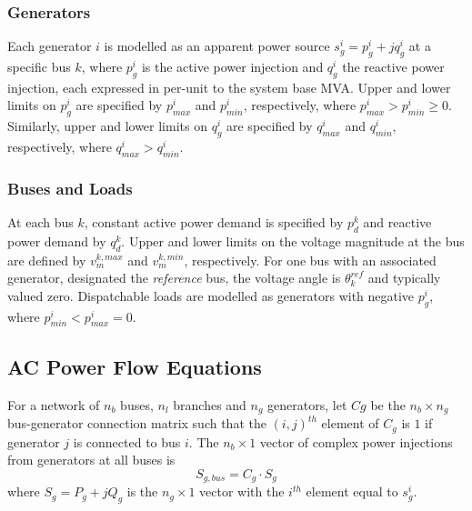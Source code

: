 \subsubsection{Generators}
Each generator $i$ is modelled as an apparent power source $s^i_g = p^i_g +
jq^i_g$ at a specific bus $k$, where $p^i_g$ is the active power injection and
$q^i_g$ the reactive power injection, each expressed in per-unit to the system
base MVA. Upper and lower limits on $p^i_g$ are specified by $p^i_{max}$ and
$p^i_{min}$, respectively, where $p^i_{max} > p^i_{min} \geq 0$.  Similarly,
upper and lower limits on $q^i_g$ are specified by $q_{max}^i$ and
$q_{min}^i$, respectively, where $q^i_{max} > q^i_{min}$.

\subsubsection{Buses and Loads}
At each bus $k$, constant active power demand is specified by
$p^k_d$ and reactive power demand by $q^k_d$.  Upper and lower
limits on the voltage magnitude at the bus are defined by $v_m^{k,max}$ and
$v_m^{k,min}$, respectively.  For one bus with an associated generator,
designated the \textit{reference} bus, the voltage angle is $\theta^{ref}_k$
and typically valued zero.
Dispatchable loads are modelled as generators with negative $p^i_g$, where
$p^i_{min} < p^i_{max} = 0$. %

\subsection{AC Power Flow Equations}
For a network of $n_b$ buses, $n_l$ branches and $n_g$ generators, let $Cg$ be
the $n_b \times n_g$ bus-generator connection matrix such that the $(i,j)^{th}$
element of $C_{g}$ is $1$ if generator $j$ is connected to bus $i$.  The
$n_b \times 1$ vector of complex power injections from generators at all buses
is
\begin{equation}
S_{g,bus} = C_g \cdot S_g
\end{equation}
where $S_g = P_g + jQ_g$ is the $n_g \times 1$ vector with the $i^{th}$ element
equal to $s^i_g$.

